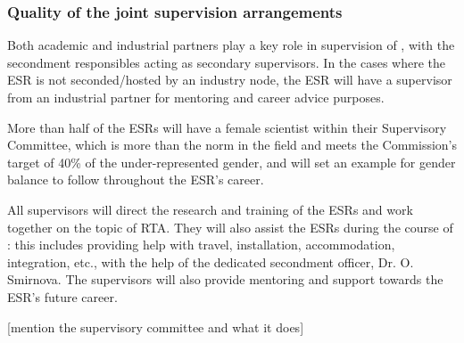 




\vskip-10pt

\subsubsection{Quality of the joint supervision arrangements}
\label{sec:jointsuperqual}



Both academic and industrial partners play a key role in supervision of \acronym, with the secondment responsibles acting as secondary supervisors. 
In the cases where the ESR is not seconded/hosted by an industry node, the ESR will have a supervisor from an industrial partner for mentoring and career advice purposes. 

More than half of the ESRs will have a female scientist within their Supervisory Committee, which is more than the norm in the field and meets the Commission's target of 40\% of the under-represented gender, and will set an example for gender balance to follow throughout the ESR's career.

All supervisors will direct the research and training of the ESRs and work together on the topic of RTA. 
They will also assist the ESRs during the course of \acronym: this includes providing help with travel, installation, accommodation, integration, etc., with the help of the dedicated secondment officer, Dr. O. Smirnova. 
The supervisors will also provide mentoring and support towards the ESR's future career. 

[mention the supervisory committee and what it does]


